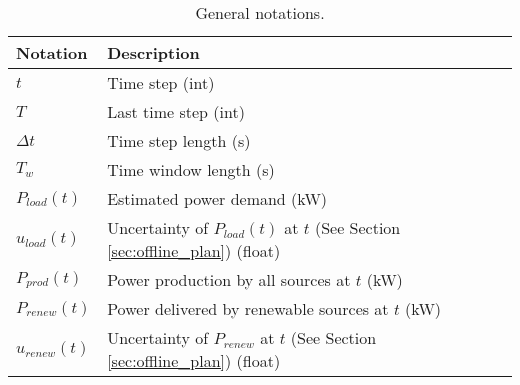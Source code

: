 \begin{table*}[!htb]
\centering
\caption{General notations.}
\label{tab:notation_system}
\begin{tabular}{l|l}
    \hline
    Notation & Description \\\hline\hline
    $t$ & Time step (int)\\
    $T$ & Last time step (int)\\
    $\Delta t$ & Time step length (s)\\
    $T_{w}$ & Time window length (s)\\
    $P_{load}(t)$ & Estimated power demand (kW)\\
    $u_{load}(t)$ & Uncertainty of $P_{load}(t)$ at $t$ (See Section \ref{sec:offline_plan}) (float)\\
    $P_{prod}(t)$ & Power production by all sources at $t$ (kW)\\
    $P_{renew}(t)$ & Power delivered by renewable sources at $t$ (kW)\\
    $u_{renew}(t)$ & Uncertainty of $P_{renew}$ at $t$ (See Section \ref{sec:offline_plan}) (float)\\
    \hline
\end{tabular}
\end{table*}